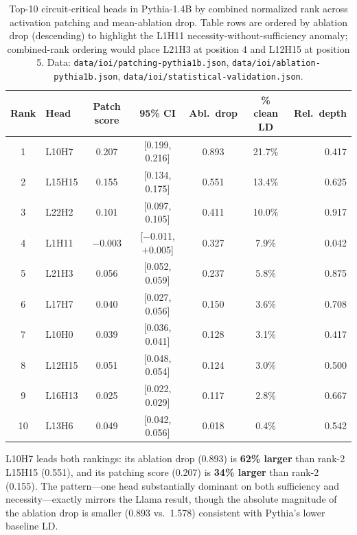 \documentclass[11pt,a4paper]{article}
\begin{document}
\begin{table}[H]
  \centering
  \caption{Top-10 circuit-critical heads in Pythia-1.4B by combined normalized rank
    across activation patching and mean-ablation drop. Table rows are ordered by
    ablation drop (descending) to highlight the L1H11 necessity-without-sufficiency
    anomaly; combined-rank ordering would place L21H3 at position 4 and L12H15 at
    position 5. Data: \texttt{data/ioi/patching-pythia1b.json},
    \texttt{data/ioi/ablation-pythia1b.json},
    \texttt{data/ioi/statistical-validation.json}.}
  \label{tab:pythia-circuit}
  \smallskip
  \small\setlength{\tabcolsep}{4pt}
  \begin{tabular}{clccccr}
    \toprule
    Rank & Head   & Patch score & 95\% CI             & Abl.\ drop & \% clean LD & Rel.\ depth \\
    \midrule
    1    & L10H7  & 0.207       & [0.199, 0.216]      & 0.893       & 21.7\%      & 0.417 \\
    2    & L15H15 & 0.155       & [0.134, 0.175]      & 0.551       & 13.4\%      & 0.625 \\
    3    & L22H2  & 0.101       & [0.097, 0.105]      & 0.411       & 10.0\%      & 0.917 \\
    4    & L1H11  & $-$0.003    & [$-$0.011, $+$0.005]& 0.327       &  7.9\%      & 0.042 \\
    5    & L21H3  & 0.056       & [0.052, 0.059]      & 0.237       &  5.8\%      & 0.875 \\
    6    & L17H7  & 0.040       & [0.027, 0.056]      & 0.150       &  3.6\%      & 0.708 \\
    7    & L10H0  & 0.039       & [0.036, 0.041]      & 0.128       &  3.1\%      & 0.417 \\
    8    & L12H15 & 0.051       & [0.048, 0.054]      & 0.124       &  3.0\%      & 0.500 \\
    9    & L16H13 & 0.025       & [0.022, 0.029]      & 0.117       &  2.8\%      & 0.667 \\
    10   & L13H6  & 0.049       & [0.042, 0.056]      & 0.018       &  0.4\%      & 0.542 \\
    \bottomrule
  \end{tabular}
\end{table}

L10H7 leads both rankings: its ablation drop (0.893) is \textbf{62\% larger} than
rank-2 L15H15 (0.551), and its patching score (0.207) is \textbf{34\% larger} than
rank-2 (0.155). The pattern---one head substantially dominant on both sufficiency and
necessity---exactly mirrors the Llama result, though the absolute magnitude of the
ablation drop is smaller (0.893 vs.\ 1.578) consistent with Pythia's lower baseline
LD.
\end{document}
